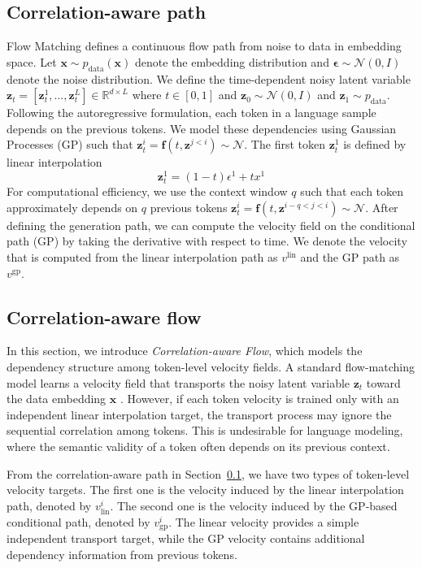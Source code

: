 \documentclass{article} %
\begin{document}
\subsection{Correlation-aware path}
\label{sec:corr_path}
Flow Matching defines a continuous flow path from noise to data in embedding space. Let $\mathbf{x} \sim p_{\text{data}}(\mathbf{x})$ denote the embedding distribution and $\mathbf{\epsilon} \sim \mathcal{N}(0, I)$ denote the noise distribution. We define the time-dependent noisy latent variable $\mathbf{z}_t = [\mathbf{z}^{1}_t, ..., \mathbf{z}^{L}_t] \in \mathbb{R}^{d \times L }$ where $t \in [0,1]$ and $\mathbf{z}_0 \sim \mathcal{N}(0, I)$ and $\mathbf{z}_1 \sim p_{\text{data}}$. Following the autoregressive formulation, each token in a language sample depends on the previous tokens. We model these dependencies using Gaussian Processes (GP) such that $\mathbf{z}^{i}_{t} = \mathbf{f}(t, \mathbf{z}^{j<i}) \sim \mathcal{N}$. The first token $\mathbf{z}^1_t$ is defined by linear interpolation
\begin{equation}
    \mathbf{z}^{1}_t = (1-t) \epsilon^1 + t x^1
\end{equation}
For computational efficiency, we use the context window $q$ such that each token approximately depends on $q$ previous tokens $\mathbf{z}^{i}_{t} = \mathbf{f}(t, \mathbf{z}^{i-q<j<i}) \sim \mathcal{N}$. After defining the generation path, we can compute the velocity field on the conditional path (GP) by taking the derivative with respect to time. We denote the velocity that is computed from the linear interpolation path as $v^{\text{lin}}$ and the GP path as $v^{\text{gp}}$.

\subsection{Correlation-aware flow}
\label{sec:corr_flow}
In this section, we introduce \emph{Correlation-aware Flow}, which models the dependency structure among token-level velocity fields. 
A standard flow-matching model learns a velocity field that transports the noisy latent variable $\mathbf{z}_t$ toward the data embedding $\mathbf{x}$ \citep{lipman2023flowmatching}. 
However, if each token velocity is trained only with an independent linear interpolation target, the transport process may ignore the sequential correlation among tokens. 
This is undesirable for language modeling, where the semantic validity of a token often depends on its previous context.

From the correlation-aware path in Section~\ref{sec:corr_path}, we have two types of token-level velocity targets. 
The first one is the velocity induced by the linear interpolation path, denoted by $v_{\text{lin}}^{i}$. 
The second one is the velocity induced by the GP-based conditional path, denoted by $v_{\text{gp}}^{i}$. 
The linear velocity provides a simple independent transport target, while the GP velocity contains additional dependency information from previous tokens.
\end{document}
